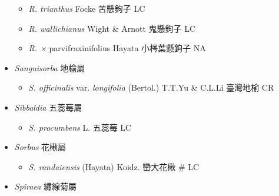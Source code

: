 \begin{itemize}
\begin{itemize}
        \item[] \textit{R. trianthus} Focke  苦懸鉤子   LC
        \item[] \textit{R. wallichianus} Wight \& Arnott  鬼懸鉤子   LC
        \item[] \textit{R. ×} parvifraxinifolius \textit{} Hayata  小梣葉懸鉤子   NA
  \end{itemize}
 \item[] \textit{Sanguisorba} 地榆屬
                                
  \begin{itemize}
        \item[] \textit{S. officinalis} var. \textit{longifolia} (Bertol.) T.T.Yu \& C.L.Li  臺灣地榆   CR
  \end{itemize}
 \item[] \textit{Sibbaldia} 五蕊莓屬
                                
  \begin{itemize}
        \item[] \textit{S. procumbens} L.  五蕊莓   LC
  \end{itemize}
 \item[] \textit{Sorbus} 花楸屬
                                
  \begin{itemize}
        \item[] \textit{S. randaiensis} (Hayata) Koidz.  巒大花楸  \# LC
  \end{itemize}
 \item[] \textit{Spiraea} 繡線菊屬
                                

\end{itemize}
